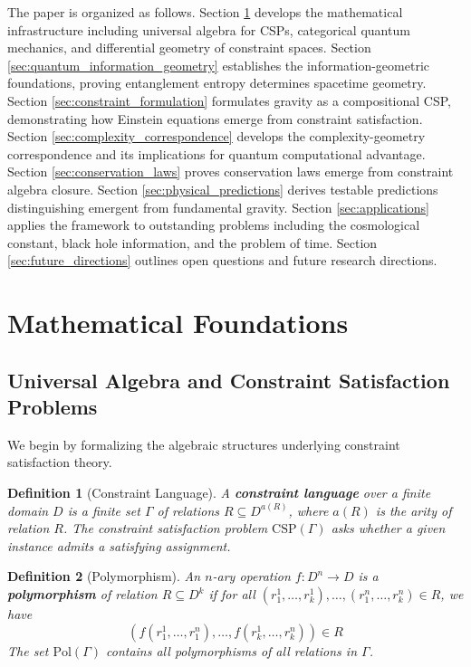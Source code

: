 \documentclass[11pt,a4paper]{article}
\newtheorem{definition}{Definition}[section]
\theoremstyle{remark}
\theoremstyle{definition}
\begin{document}
The paper is organized as follows. Section \ref{sec:mathematical_foundations} develops the mathematical infrastructure including universal algebra for CSPs, categorical quantum mechanics, and differential geometry of constraint spaces. Section \ref{sec:quantum_information_geometry} establishes the information-geometric foundations, proving entanglement entropy determines spacetime geometry. Section \ref{sec:constraint_formulation} formulates gravity as a compositional CSP, demonstrating how Einstein equations emerge from constraint satisfaction. Section \ref{sec:complexity_correspondence} develops the complexity-geometry correspondence and its implications for quantum computational advantage. Section \ref{sec:conservation_laws} proves conservation laws emerge from constraint algebra closure. Section \ref{sec:physical_predictions} derives testable predictions distinguishing emergent from fundamental gravity. Section \ref{sec:applications} applies the framework to outstanding problems including the cosmological constant, black hole information, and the problem of time. Section \ref{sec:future_directions} outlines open questions and future research directions.

\section{Mathematical Foundations}
\label{sec:mathematical_foundations}

\subsection{Universal Algebra and Constraint Satisfaction Problems}

We begin by formalizing the algebraic structures underlying constraint satisfaction theory.

\begin{definition}[Constraint Language]
A \textbf{constraint language} over a finite domain $D$ is a finite set $\Gamma$ of relations $R \subseteq D^{a(R)}$, where $a(R)$ is the arity of relation $R$. The constraint satisfaction problem $\text{CSP}(\Gamma)$ asks whether a given instance admits a satisfying assignment.
\end{definition}

\begin{definition}[Polymorphism]
An $n$-ary operation $f: D^n \to D$ is a \textbf{polymorphism} of relation $R \subseteq D^k$ if for all $(r_1^1, \ldots, r_k^1), \ldots, (r_1^n, \ldots, r_k^n) \in R$, we have
\begin{equation}
\left(f(r_1^1, \ldots, r_1^n), \ldots, f(r_k^1, \ldots, r_k^n)\right) \in R
\end{equation}
The set $\text{Pol}(\Gamma)$ contains all polymorphisms of all relations in $\Gamma$.
\end{definition}
\end{document}
